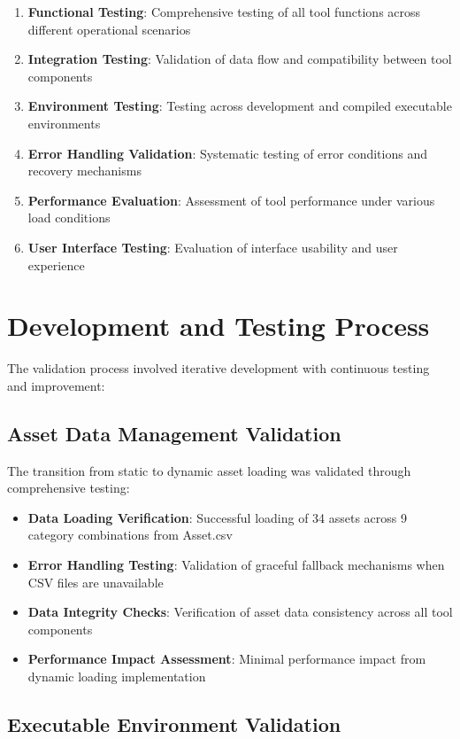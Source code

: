 \documentclass[binding=0.6cm]{sapthesis}
\begin{document}
\begin{enumerate}
    \item \textbf{Functional Testing}: Comprehensive testing of all tool functions across different operational scenarios
    \item \textbf{Integration Testing}: Validation of data flow and compatibility between tool components
    \item \textbf{Environment Testing}: Testing across development and compiled executable environments
    \item \textbf{Error Handling Validation}: Systematic testing of error conditions and recovery mechanisms
    \item \textbf{Performance Evaluation}: Assessment of tool performance under various load conditions
    \item \textbf{User Interface Testing}: Evaluation of interface usability and user experience
\end{enumerate}

\section{Development and Testing Process}

The validation process involved iterative development with continuous testing and improvement:

\subsection{Asset Data Management Validation}

The transition from static to dynamic asset loading was validated through comprehensive testing:

\begin{itemize}
    \item \textbf{Data Loading Verification}: Successful loading of 34 assets across 9 category combinations from Asset.csv
    \item \textbf{Error Handling Testing}: Validation of graceful fallback mechanisms when CSV files are unavailable
    \item \textbf{Data Integrity Checks}: Verification of asset data consistency across all tool components
    \item \textbf{Performance Impact Assessment}: Minimal performance impact from dynamic loading implementation
\end{itemize}

\subsection{Executable Environment Validation}
\end{document}

